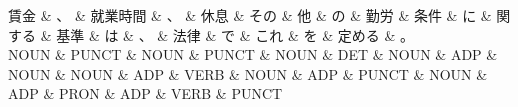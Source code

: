 \documentclass[tikz,border=5pt]{standalone}
\begin{document}
\normalsize
\begin{dependency}[edge unit distance=12.0pt]
    \begin{deptext}[column sep=1em]
        賃金 \& 、 \& 就業時間 \& 、 \& 休息 \& その \& 他 \& の \& 勤労 \& 条件 \& に \& 関する \& 基準 \& は \& 、 \& 法律 \& で \& これ \& を \& 定める \& 。\\
        NOUN \& PUNCT \& NOUN \& PUNCT \& NOUN \& DET \& NOUN \& ADP \& NOUN \& NOUN \& ADP \& VERB \& NOUN \& ADP \& PUNCT \& NOUN \& ADP \& PRON \& ADP \& VERB \& PUNCT\\
    \end{deptext}
\end{dependency}
\end{document}
